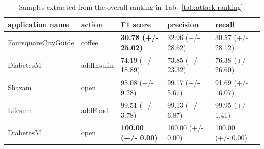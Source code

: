 \begin{table}[H]
\centering
 \begin{tabular}{llllll} 
 \toprule
 application name & action & F1 score & precision & recall \\ [0.5ex] 
 \midrule
FoursquareCityGuide & coffee & \textbf{30.78 (+/- 25.02)} & 32.96 (+/- 28.62) & 30.57 (+/- 28.12)\\
DiabetesM & addInsulin & 74.19 (+/- 18.89) & 73.85 (+/- 23.32) & 76.38 (+/- 26.60)\\
Shazam & open & 95.08 (+/- 9.28) & 99.17 (+/- 5.67) & 91.69 (+/- 16.07)\\
 Lifesum & addFood & 99.51 (+/- 3.78) & 99.13 (+/- 6.87) & 99.95 (+/- 1.41)\\
DiabetesM & open & \textbf{100.00 (+/- 0.00)} & 100.00 (+/- 0.00) & 100.00 (+/- 0.00)\\
 \bottomrule
\end{tabular}
\caption{Samples extracted from the overall ranking in Tab.~\ref{tab:attack ranking}. }
    \label{tab:rank summarize}
\end{table}